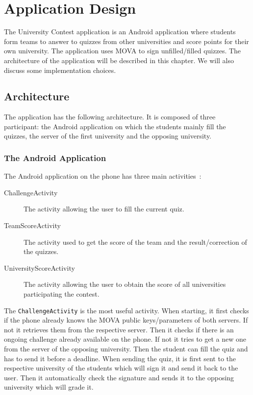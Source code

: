 \chapter{Application Design}
\label{chap:design}
    
    The University Contest application is an Android application where students form teams to answer to quizzes from other universities and score points for their own university.
    The application uses MOVA to sign unfilled/filled quizzes.
    The architecture of the application will be described in this chapter. We will also discuss some implementation choices.

    \section{Architecture}
    \label{sec:archi}
    The application has the following architecture. It is composed of three participant: 
    the Android application on which the students mainly fill the quizzes, the server of the first university and the opposing university.
    
    \subsection{The Android Application}
    The Android application on the phone has three main activities~\cite{cite:android}:
    \begin{description}
        \item[ChallengeActivity] The activity allowing the user to fill the current quiz.
        \item[TeamScoreActivity] The activity used to get the score of the team and the result/correction of the quizzes.
        \item[UniversityScoreActivity] The activity allowing the user to obtain the score of all universities participating the contest.
    \end{description}
    The \texttt{ChallengeActivity} is the most useful activity. When starting, it first checks if the phone already knows the MOVA public keys/parameters of both servers. If not it 
    retrieves them from the respective server. Then it checks if there is an ongoing challenge already available on the phone. If not it tries to get a new one from the server of 
    the opposing university. Then the student can fill the quiz and has to send it before a deadline. When sending the quiz, it is first sent to the respective university of the students 
    which will sign it and send it back to the user. Then it automatically check the signature and sends it to the opposing university which will grade it.

